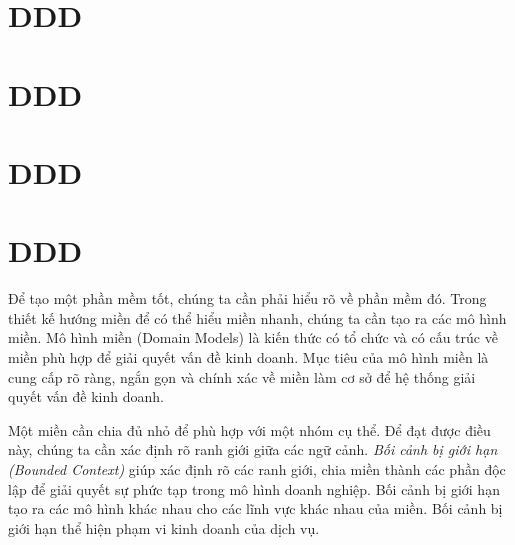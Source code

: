 \section{DDD}

\section{DDD}

\section{DDD}

\section{DDD}


Để tạo một phần mềm tốt, chúng ta cần phải hiểu rõ về phần mềm đó. Trong thiết kế hướng miền để có thể hiểu miền nhanh, chúng ta cần tạo ra các mô hình miền. Mô hình miền (Domain Models) là kiến thức có tổ chức và có cấu trúc về miền phù hợp để giải quyết vấn đề kinh doanh. Mục tiêu của mô hình miền là cung cấp rõ ràng, ngắn gọn và chính xác về miền làm cơ sở để hệ thống giải quyết vấn đề kinh doanh.




Một miền cần chia đủ nhỏ để phù hợp với một nhóm cụ thể. Để đạt được điều này, chúng ta cần xác định rõ ranh giới giữa các ngữ cảnh. \emph{Bối cảnh bị giới hạn (Bounded Context)} giúp xác định rõ các ranh giới, chia miền thành các phần độc lập để giải quyết sự phức tạp trong mô hình doanh nghiệp. Bối cảnh bị giới hạn tạo ra các mô hình khác nhau cho các lĩnh vực khác nhau của miền. Bối cảnh bị giới hạn thể hiện phạm vi kinh doanh của dịch vụ.

